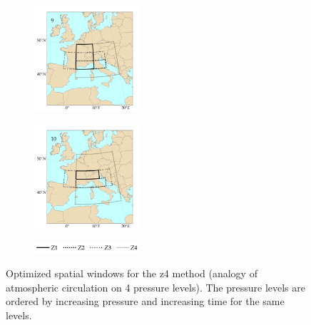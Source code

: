 \documentclass[twocol]{ametsoc}
\begin{document}
\begin{figure}[htb]
\begin{subfigure}{.5\columnwidth}
		\centering
		\includegraphics[width=3.9cm]{figures/spatial_win_z4/Spatial_windows_9.png}
	\end{subfigure}%
	\begin{subfigure}{.5\columnwidth}
		\centering
		\includegraphics[width=3.9cm]{figures/spatial_win_z4/Spatial_windows_10.png}
	\end{subfigure}
	\begin{subfigure}{.5\columnwidth}
		\centering
		\includegraphics[width=3.9cm]{figures/spatial_win_z4/legend.png}
	\end{subfigure}
	\caption{Optimized spatial windows for the z4 method (analogy of atmospheric circulation on 4 pressure levels). The pressure levels are ordered by increasing pressure and increasing time for the same levels.}
	\label{fig:spatial_windows_z4}
\end{figure}
\end{document}
